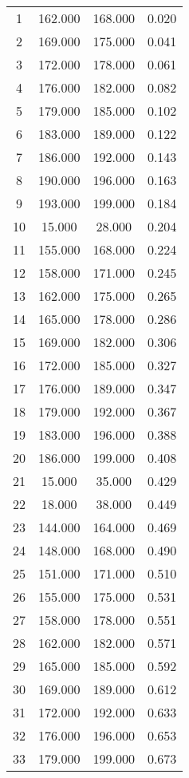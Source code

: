 % 
\begin{tabular}{cccc}
  \hline
  \hline
1 & 162.000 & 168.000 & 0.020 \\ 
  2 & 169.000 & 175.000 & 0.041 \\ 
  3 & 172.000 & 178.000 & 0.061 \\ 
  4 & 176.000 & 182.000 & 0.082 \\ 
  5 & 179.000 & 185.000 & 0.102 \\ 
  6 & 183.000 & 189.000 & 0.122 \\ 
  7 & 186.000 & 192.000 & 0.143 \\ 
  8 & 190.000 & 196.000 & 0.163 \\ 
  9 & 193.000 & 199.000 & 0.184 \\ 
  10 & 15.000 & 28.000 & 0.204 \\ 
  11 & 155.000 & 168.000 & 0.224 \\ 
  12 & 158.000 & 171.000 & 0.245 \\ 
  13 & 162.000 & 175.000 & 0.265 \\ 
  14 & 165.000 & 178.000 & 0.286 \\ 
  15 & 169.000 & 182.000 & 0.306 \\ 
  16 & 172.000 & 185.000 & 0.327 \\ 
  17 & 176.000 & 189.000 & 0.347 \\ 
  18 & 179.000 & 192.000 & 0.367 \\ 
  19 & 183.000 & 196.000 & 0.388 \\ 
  20 & 186.000 & 199.000 & 0.408 \\ 
  21 & 15.000 & 35.000 & 0.429 \\ 
  22 & 18.000 & 38.000 & 0.449 \\ 
  23 & 144.000 & 164.000 & 0.469 \\ 
  24 & 148.000 & 168.000 & 0.490 \\ 
  25 & 151.000 & 171.000 & 0.510 \\ 
  26 & 155.000 & 175.000 & 0.531 \\ 
  27 & 158.000 & 178.000 & 0.551 \\ 
  28 & 162.000 & 182.000 & 0.571 \\ 
  29 & 165.000 & 185.000 & 0.592 \\ 
  30 & 169.000 & 189.000 & 0.612 \\ 
  31 & 172.000 & 192.000 & 0.633 \\ 
  32 & 176.000 & 196.000 & 0.653 \\ 
  33 & 179.000 & 199.000 & 0.673 \\ 

\end{tabular}
